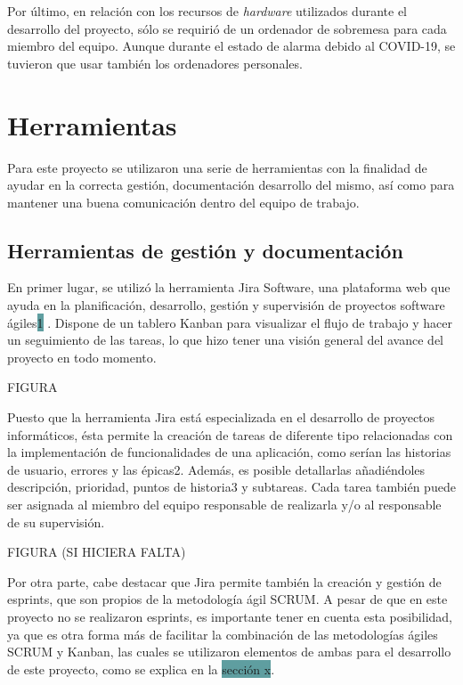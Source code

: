 \documentclass[pdftex,11pt,a4paper]{book}
\begin{document}
Por último, en relación con los recursos de \textit{hardware} utilizados durante el desarrollo del proyecto, sólo se requirió de un ordenador de sobremesa para cada miembro del equipo. Aunque durante el estado de alarma debido al COVID-19, se tuvieron que usar también los ordenadores personales.


\section{Herramientas}

Para este proyecto se utilizaron una serie de herramientas con la finalidad de ayudar en la correcta gestión, documentación desarrollo del mismo, así como para mantener una buena comunicación dentro del equipo de trabajo.

\subsection{Herramientas de gestión y documentación} %
En primer lugar, se utilizó la herramienta Jira Software, una plataforma web que ayuda en la planificación, desarrollo, gestión y supervisión de proyectos software ágiles\colorbox{CadetBlue}{1} \cite{bib:atlassian}. Dispone de un tablero Kanban para visualizar el flujo de trabajo y hacer un seguimiento de las tareas, lo que hizo tener una visión general del avance del proyecto en todo momento. 

FIGURA

Puesto que la herramienta Jira está especializada en el desarrollo de proyectos informáticos, ésta permite la creación de tareas de diferente tipo relacionadas con la implementación de funcionalidades de una aplicación, como serían las historias de usuario, errores y las épicas2. Además, es posible detallarlas añadiéndoles descripción, prioridad, puntos de historia3 y subtareas. Cada tarea también puede ser asignada al miembro del equipo responsable de realizarla y/o al responsable de su supervisión.

FIGURA (SI HICIERA FALTA)

Por otra parte, cabe destacar que Jira permite también la creación y gestión de esprints, que son propios de la metodología ágil SCRUM. A pesar de que en este proyecto no se realizaron esprints, es importante tener en cuenta esta posibilidad, ya que es otra forma más de facilitar la combinación de las metodologías ágiles SCRUM y Kanban, las cuales se utilizaron elementos de ambas para el desarrollo de este proyecto, como se explica en la \colorbox{CadetBlue}{sección x}.
\end{document}
